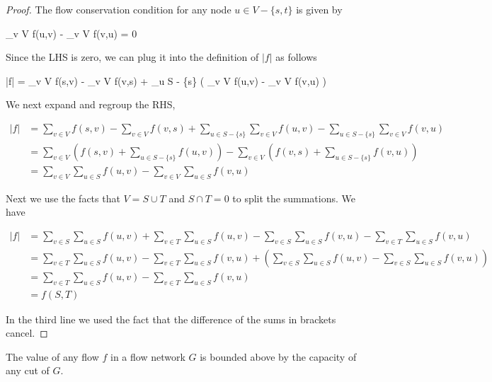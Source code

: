 \begin{proof}
  The flow conservation condition for any node $u \in V - \{s,t\}$ is given by

  \bee
  \sum_{v \in V} f(u,v) - \sum_{v \in V} f(v,u) = 0
  \eee

  Since the LHS is zero, we can plug it into the definition of $|f|$ as follows

  \bee
  |f| = \sum_{v \in V} f(s,v) - \sum_{v \in V} f(v,s) + \sum_{u \in S - \{s\}} \left( \sum_{v \in V} f(u,v) - \sum_{v \in V} f(v,u) \right)
  \eee

  We next expand and regroup the RHS,

  \begin{align*}
  |f| &= \sum_{v \in V} f(s,v) - \sum_{v \in V} f(v,s) + \sum_{u \in S - \{s\}} \sum_{v \in V} f(u,v) - \sum_{u \in S - \{s\}} \sum_{v \in V} f(v,u) \\
      &= \sum_{v \in V} \left( f(s,v) + \sum_{u \in S - \{s\}}f(u,v)  \right) - \sum_{v \in V} \left( f(v,s) + \sum_{u \in S - \{s\}} f(v,u)  \right) \\
      &= \sum_{v \in V} \sum_{u \in S} f(u,v) - \sum_{v \in V} \sum_{u \in S} f(v,u)
  \end{align*}

  Next we use the facts that $V = S \cup T$ and $S \cap T = 0$ to split the summations. We have

  \begin{align*}
    |f| &= \sum_{v \in S} \sum_{u \in S} f(u,v)  + \sum_{v \in T} \sum_{u \in S} f(u,v) - \sum_{v \in S} \sum_{u \in S} f(v,u) - \sum_{v \in T} \sum_{u \in S} f(v,u) \\
        &= \sum_{v \in T} \sum_{u \in S} f(u,v)  - \sum_{v \in T} \sum_{u \in S} f(v,u) + \left(\sum_{v \in S} \sum_{u \in S} f(u,v) - \sum_{v \in S} \sum_{u \in S} f(v,u) \right)\\
        &= \sum_{v \in T} \sum_{u \in S} f(u,v)  - \sum_{v \in T} \sum_{u \in S} f(v,u) \\
        &= f(S,T)
  \end{align*}

  In the third line we used the fact that the difference of the sums in brackets cancel.
\end{proof}


\begin{theorem}
  The value of any flow $f$ in a flow network $G$ is bounded above by the capacity of any cut of $G$.
\end{theorem}

